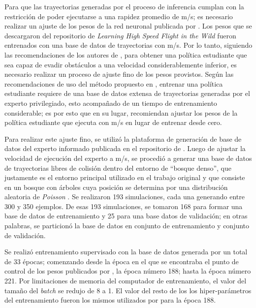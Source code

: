 Para que las trayectorias generadas por el proceso de inferencia cumplan con la restricción de poder ejecutarse a una rapidez promedio de  m/s; es necesario realizar un ajuste de los pesos de la red neuronal publicada por \cite{Loquercio2021}. Los pesos que se descargaron del repositorio de \textit{Learning High Speed Flight in the Wild} fueron entrenados con una base de datos de trayectorias con  m/s. Por lo tanto, siguiendo las recomendaciones de los autores de \cite{Loquercio2021}, para obtener una política estudiante que sea capaz de evadir obstáculos a una velocidad considerablemente inferior, es necesario realizar un proceso de ajuste fino de los pesos provistos. Según las recomendaciones de uso del método propuesto en \cite{Loquercio2021}, entrenar una política estudiante requiere de una base de datos extensa de trayectorias generadas por el experto privilegiado, esto acompañado de un tiempo de entrenamiento considerable; es por esto que en su lugar, recomiendan ajustar los pesos de la política estudiante que ejecuta con  m/s en lugar de entrenar desde cero.

Para realizar este ajuste fino, se utilizó la plataforma de generación de base de datos del experto informado publicada en el repositorio de \cite{Loquercio2021}. Luego de ajustar la velocidad de ejecución del experto a  m/s, se procedió a generar una base de datos de trayectorias libres de colisión dentro del entorno de ``bosque denso'', que justamente es el entorno principal utilizado en el trabajo original \cite{Loquercio2021} y que consiste en un bosque con árboles cuya posición se determina por una distribución aleatoria de \textit{Poisson} \cite{Loquercio2021}. Se realizaron 193 simulaciones, cada una generando entre 300 y 350 ejemplos. De esas 193 simulaciones, se tomaron 168 para formar una base de datos de entrenamiento y 25 para una base datos de validación; en otras palabras, se particionó la base de datos en  conjunto de entrenamiento y  conjunto de validación.

Se realizó entrenamiento supervisado con la base de datos generada por un total de 33 épocas; comenzando desde la época en el que se encontraba el punto de control de los pesos publicados por \cite{Loquercio2021}, la época número  188; hasta la época número  221. Por limitaciones de memoria del computador de entrenamiento, el valor del tamaño del \textit{batch} se redujo de 8 a 1. El valor del resto de los los hiper-parámetros del entrenamiento fueron los mismos utilizados por \cite{Loquercio2021} para la época 188.


